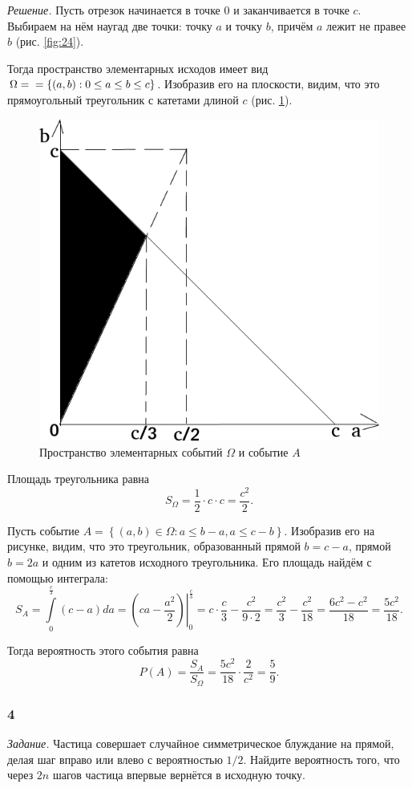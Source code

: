 \textit{Решение.} Пусть отрезок начинается в точке 0 и заканчивается в точке $c$.
Выбираем на нём наугад две точки: точку $a$ и точку $b$, причём $a$ лежит не правее $b$ (рис. \ref{fig:24}).

Тогда пространство элементарных исходов имеет вид $ \Omega =  \\
= \left\{ \left( a, b \right): 0 \leq a \leq b \leq c \right\} $.
Изобразив его на плоскости, видим, что это прямоугольный треугольник с катетами длиной $c$ (рис. \ref{fig:33}).

\begin{figure}[h!]
  \centering
  \includegraphics[width=.4\textwidth]{./pictures/t1v3_3.png}
  \caption{Пространство элементарных событий $ \Omega$ и событие $A$}
  \label{fig:33}
\end{figure}

Площадь треугольника равна
$$S_{ \Omega } =
\frac{1}{2} \cdot c \cdot c =
\frac{c^2}{2}.$$

Пусть событие $A = \left\{ \left( a, b \right) \in \Omega: a \leq b-a, a \leq c-b \right\} $.
Изобразив его на рисунке, видим, что это треугольник, образованный прямой $b = c - a$, прямой $b = 2a$ и одним из катетов исходного треугольника.
Его площадь найдём с помощью интеграла:
$$S_A =
\int \limits_0^{ \frac{c}{3} } \left( c - a \right) da =
\left. \left( ca - \frac{a^2}{2} \right) \right|_0^{ \frac{c}{3} } =
c \cdot \frac{c}{3} - \frac{c^2}{9 \cdot 2} =
\frac{c^2}{3} - \frac{c^2}{18} =
\frac{6c^2 - c^2}{18} =
\frac{5c^2}{18}.$$

Тогда вероятность этого события равна
$$P \left( A \right) =
\frac{S_A}{S_{ \Omega }} =
\frac{5c^2}{18} \cdot \frac{2}{c^2} =
\frac{5}{9}.$$

\subsubsection*{4}

\textit{Задание.} Частица совершает случайное симметрическое блуждание на прямой, делая шаг вправо или влево с вероятностью $1/2$.
Найдите вероятность того, что через $2n$ шагов частица впервые вернётся в исходную точку.

